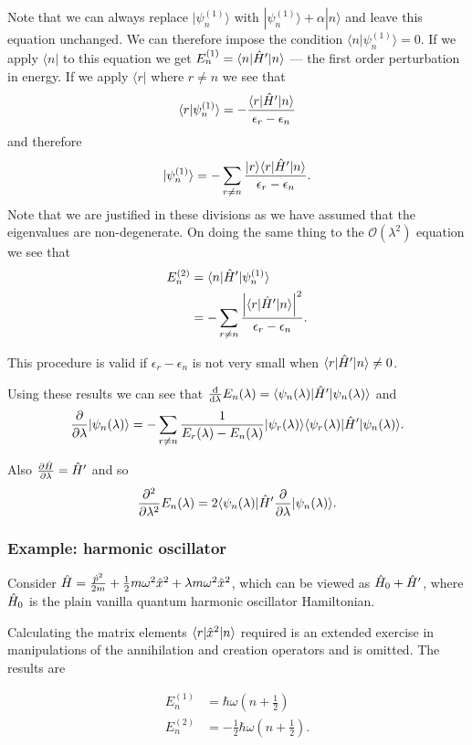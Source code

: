 \documentclass{notes}
\newcommand{\cO}{\mathcal{O}}
\newcommand{\bra}[1]{\langle#1|}
\newcommand{\ket}[1]{|#1\rangle}
\newcommand{\scp}[2]{\langle#1|#2\rangle}
\begin{document}
Note that we can always replace $\ket{\psi_n^{(1)}}$ with
$\ket{\psi_n^{(1)}} + \alpha \ket{n}$ and leave this equation unchanged.  We
can therefore impose the condition $\scp{n}{\psi_n^{(1)}} = 0$.  If
we apply $\bra{n}$ to this equation we get
$E_n^{(1)} = \bra{n}\Hat{H}'\ket{n}$ --- the first order perturbation in
energy.  If we apply $\bra{r}$ where $r \neq n$ we see that
\[
\scp{r}{\psi_n^{(1)}} = - \frac{\bra{r} \Hat{H}' \ket{n}}{\epsilon_r
- \epsilon_n}
\]
and therefore
\[
\ket{\psi_n^{(1)}} = - \sum_{r \neq n} \frac{\ket{r} \bra{r} \Hat{H}' \ket{n}}
{\epsilon_r - \epsilon_n}.
\]
Note that we are justified in these divisions as we have assumed that the
eigenvalues are non-degenerate.  On doing the same thing to
the $\cO(\lambda^2)$ equation we see that
\begin{align*}
E^{(2)}_n &= \bra{n} \Hat{H}' \ket{\psi_n^{(1)}} \\
&= - \sum_{r \neq n} \frac{\abs{\bra{r} \Hat{H}' \ket{n}}^2}
{\epsilon_r - \epsilon_n}.
\end{align*}

This procedure is valid if $\epsilon_r - \epsilon_n$ is not very small when
$\bra{r} \Hat{H}' \ket{n} \neq 0$.

Using these results we can see that $\diff{}{\lambda}E_n(\lambda)
= \bra{\psi_n(\lambda)}\Hat{H}'\ket{\psi_n(\lambda)}$ and
\[
\pd{}{\lambda} \ket{\psi_n(\lambda)} = - \sum_{r \neq n}
\frac{1}{E_r(\lambda)-E_n(\lambda)} \ket{\psi_r(\lambda)}
\bra{\psi_r(\lambda)} \Hat{H}' \ket{\psi_n(\lambda)}.
\]

Also $\frac{\partial \Hat{H}}{\partial \lambda} = \Hat{H}'$ and so
\[
\pd{^2}{\lambda^2} E_n(\lambda) = 2 \bra{\psi_n(\lambda)} \Hat{H}'
\pd{}{\lambda} \ket{\psi_n(\lambda)}.
\]

\subsubsection*{Example: harmonic oscillator}

Consider $\Hat{H} = \frac{\Hat{p}^2}{2 m} + \frac{1}{2} m \omega^2 \Hat{x}^2
+ \lambda m \omega^2 \Hat{x}^2$, which can be viewed as
$\Hat{H}_0 + \Hat{H}'$, where $\Hat{H}_0$ is the plain vanilla quantum
harmonic oscillator Hamiltonian.

Calculating the matrix elements $\bra{r} \Hat{x}^2 \ket{n}$ required
is an extended exercise in manipulations of the annihilation and creation
operators and is omitted.  The results are

\begin{align*}
E_n^{(1)} &= \hbar \omega \left(n + \tfrac{1}{2}\right) \\
E_n^{(2)} &= - \frac{1}{2} \hbar \omega \left( n + \frac{1}{2} \right).
\end{align*}
\end{document}
